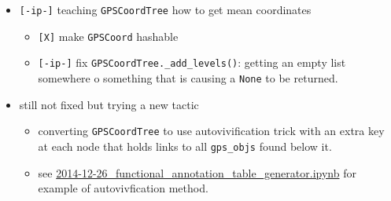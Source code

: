 \documentclass[letterpaper]{scrartcl}
\begin{document}
\begin{itemize}
\itemsep1pt\parskip0pt
\item
  \texttt{{[}-ip-{]}} teaching \texttt{GPSCoordTree} how to get mean
  coordinates

  \begin{itemize}
  \itemsep1pt\parskip0pt
  \item
    \texttt{{[}X{]}} make \texttt{GPSCoord} hashable
  \item
    \texttt{{[}-ip-{]}} fix \texttt{GPSCoordTree.\_add\_levels()}:
    getting an empty list somewhere o something that is causing a
    \texttt{None} to be returned.
  \end{itemize}
\item
  still not fixed but trying a new tactic

  \begin{itemize}
  \itemsep1pt\parskip0pt
  \item
    converting \texttt{GPSCoordTree} to use autovivification trick with
    an extra key at each node that holds links to all \texttt{gps\_objs}
    found below it.
  \item
    see
    \href{http://nbviewer.ipython.org/github/xguse/ipy_notebooks/blob/master/YALE/ddrad58/2014-12-26_functional_annotation_table_generator.ipynb}{2014-12-26\_functional\_annotation\_table\_generator.ipynb}
    for example of autovivfication method.
  \end{itemize}
\end{itemize}
\end{document}
